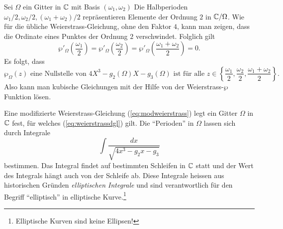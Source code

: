 \begin{bemerkung}
  Sei $\Omega$ ein Gitter in ${\mathbb{C}}$ mit Basis $(\omega_1,\omega_2)$ Die
  Halbperioden $\omega_1/2,\omega_2/2,(\omega_1+\omega_2)/2$
  repräsentieren Elemente der Ordnung $2$ in ${\mathbb{C}}/\Omega$.
  Wie für die übliche Weierstrass-Gleichung, ohne den Faktor $4$, kann
  man zeigen, dass die Ordinate eines Punktes der Ordnung $2$
  verschwindet.
  Folglich gilt
  \begin{equation*}
    \wp'_\Omega\left(\frac{\omega_1}{2}\right)=
    \wp'_\Omega\left(\frac{\omega_2}{2}\right)=
    \wp'_\Omega\left(\frac{\omega_1+\omega_2}{2}\right)=0. 
  \end{equation*}
  Es folgt, dass
  \begin{equation*}
    \wp_\Omega(z) \text{ eine Nullstelle von }
    4X^3 -g_2(\Omega) X - g_3(\Omega)  \text{ ist für alle }
    z\in \left\{\frac{\omega_1}{2},
      \frac{\omega_2}{2},
      \frac{\omega_1+\omega_2}{2}\right\}.
  \end{equation*}
  Also kann man kubische Gleichungen mit der Hilfe von der
  Weierstrass-$\wp$ Funktion lösen.
\end{bemerkung}

Eine modifizierte Weierstrass-Gleichung (\ref{eq:modweierstrass}) legt
ein Gitter $\Omega$ in ${\mathbb{C}}$ fest, für welches
(\ref{eq:weierstrassdgl}) gilt.  Die ``Perioden'' in $\Omega$ lassen
sich durch  Integrale
\begin{equation*}
  \int \frac{dx}{\sqrt{4x^3-g_2 x - g_3}}
\end{equation*}
bestimmen. Das Integral findet auf bestimmten Schleifen  in ${\mathbb{C}}$ statt
und der Wert des Integrals hängt auch von der Schleife ab.  Diese
Integrale heissen aus historischen Gründen \emph{elliptischen
  Integrale} und sind verantwortlich für den Begriff ``elliptisch'' in
elliptische Kurve.\footnote{Elliptische Kurven sind keine Ellipsen!}


